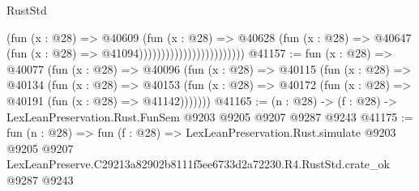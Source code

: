 \begin{lexlean}{RustStd}
\begin{coremodule}
                                            (fun (x : @28) =>
                                            @40609
                                              (fun (x : @28) =>
                                              @40628
                                                (fun (x : @28) =>
                                                @40647
                                                  (fun (x : @28) => @41094))))))))))))))))))))))))
@41157 := fun (x : @28) =>
  @40077
    (fun (x : @28) =>
    @40096
      (fun (x : @28) =>
      @40115
        (fun (x : @28) =>
        @40134
          (fun (x : @28) =>
          @40153 (fun (x : @28) => @40172 (fun (x : @28) => @40191 (fun (x : @28) => @41142)))))))
@41165 := (n : @28) -> (f : @28) -> LexLeanPreservation.Rust.FunSem @9203 @9205 @9207 @9287 @9243
@41175 := fun (n : @28) =>
  fun (f : @28) =>
  LexLeanPreservation.Rust.simulate
    @9203
    @9205
    @9207
    LexLeanPreserve.C29213a82902b8111f5ee6733d2a72230.R4.RustStd.crate_ok
    @9287
    @9243
\end{coremodule}
\end{lexlean}
